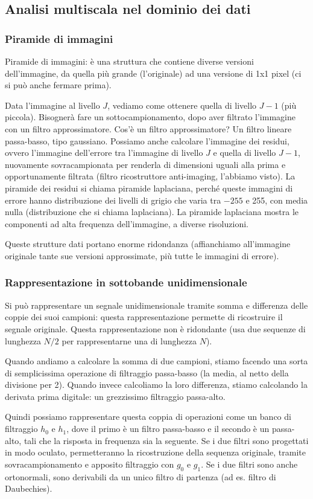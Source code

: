 \documentclass[a4paper,11pt]{article}
\begin{document}
\subsection{Analisi multiscala nel dominio dei dati}

\subsubsection{Piramide di immagini}
Piramide di immagini: è una struttura che contiene diverse versioni dell'immagine, da quella più grande (l'originale) ad una versione di 1x1 pixel (ci si può anche fermare prima).
\par
Data l'immagine al livello $J$, vediamo come ottenere quella di livello $J-1$ (più piccola). Bisognerà fare un sottocampionamento, dopo aver filtrato l'immagine con un filtro approssimatore.
Cos'è un filtro approssimatore? Un filtro lineare passa-basso, tipo gaussiano. Possiamo anche calcolare l'immagine dei residui, ovvero l'immagine dell'errore tra l'immagine di livello $J$ e quella
di livello $J-1$, nuovamente sovracampionata per renderla di dimensioni uguali alla prima e opportunamente filtrata (filtro ricostruttore anti-imaging, l'abbiamo visto).
La piramide dei residui si chiama piramide laplaciana, perché queste immagini di errore hanno distribuzione dei livelli di grigio che varia tra $-255$ e 255, con media nulla
(distribuzione che si chiama laplaciana).
La piramide laplaciana mostra le componenti ad alta frequenza dell'immagine, a diverse risoluzioni.
\par
Queste strutture dati portano enorme ridondanza (affianchiamo all'immagine originale tante sue versioni approssimate, più tutte le immagini di errore).

\subsubsection{Rappresentazione in sottobande unidimensionale}
Si può rappresentare un segnale unidimensionale tramite somma e differenza delle coppie dei suoi campioni: questa rappresentazione permette di ricostruire il segnale originale.
Questa rappresentazione non è ridondante (usa due sequenze di lunghezza $N/2$ per rappresentarne una di lunghezza $N$).
\par
Quando andiamo a calcolare la somma di due campioni, stiamo facendo una sorta di semplicissima operazione di filtraggio passa-basso (la media, al netto della divisione per 2).
Quando invece calcoliamo la loro differenza, stiamo calcolando la derivata prima digitale: un
grezzissimo filtraggio passa-alto.
\par
Quindi possiamo rappresentare questa coppia di operazioni come un banco di filtraggio $h_0$ e $h_1$, dove il primo è un filtro passa-basso e il secondo è un passa-alto,
tali che la risposta in frequenza sia la seguente. Se i due filtri sono progettati in modo oculato, permetteranno la ricostruzione della sequenza originale, tramite sovracampionamento
e apposito filtraggio con $g_0$ e $g_1$.
Se i due filtri sono anche ortonormali, sono derivabili da un unico filtro di partenza (ad es. filtro di Daubechies).
\end{document}
